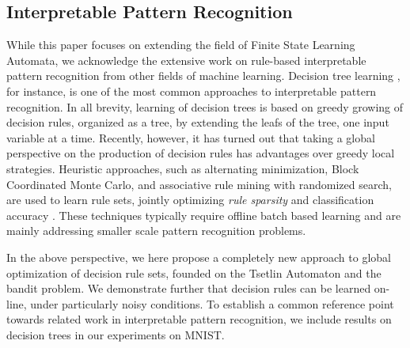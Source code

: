 \documentclass[11pt,a4paper]{article}
\begin{document}
\subsection{Interpretable Pattern Recognition}

While this paper focuses on extending the field of Finite State Learning Automata, we acknowledge the extensive work on rule-based interpretable pattern recognition from other fields of machine learning. Decision tree learning \cite{Quinlan1986}, for instance, is one of the most common approaches to interpretable pattern recognition. In all brevity, learning of decision trees is based on greedy growing of decision rules, organized as a tree, by extending the leafs of the tree, one input variable at a time.  Recently, however, it has turned out that taking a global perspective on the production of decision rules has advantages over greedy local strategies. Heuristic approaches, such as alternating minimization, Block Coordinated Monte Carlo, and associative rule mining with randomized search, are used to learn rule sets, jointly optimizing \emph{rule sparsity} and classification accuracy \cite{GuolongSu2016,Wang2017}. These techniques typically require offline batch based learning and are mainly addressing smaller scale pattern recognition problems. 

In the above perspective, we here propose a completely new approach to global optimization of decision rule sets, founded on the Tsetlin Automaton and the bandit problem. We demonstrate further that decision rules can be learned on-line, under particularly noisy conditions. To establish a common reference point towards related work in interpretable pattern recognition, we include results on decision trees in our experiments on MNIST.
\end{document}
